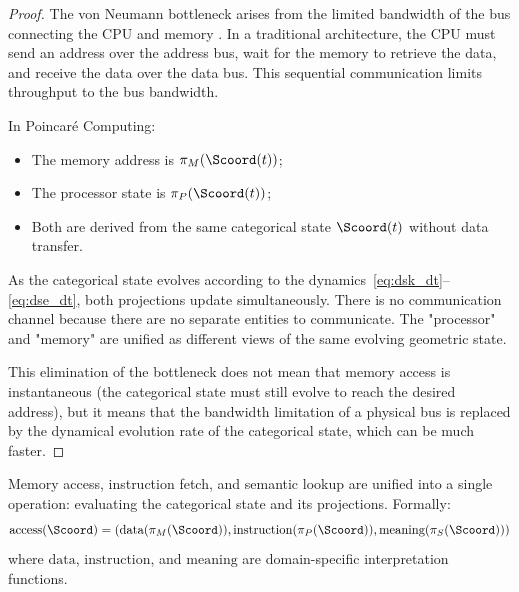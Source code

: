 \begin{proof}
The von Neumann bottleneck arises from the limited bandwidth of the bus connecting the CPU and memory \citep{vonneumann1945first}. In a traditional architecture, the CPU must send an address over the address bus, wait for the memory to retrieve the data, and receive the data over the data bus. This sequential communication limits throughput to the bus bandwidth.

In Poincaré Computing:
\begin{itemize}
    \item The memory address is $\pi_M(\Scoord(t))$;
    \item The processor state is $\pi_P(\Scoord(t))$;
    \item Both are derived from the same categorical state $\Scoord(t)$ without data transfer.
\end{itemize}

As the categorical state evolves according to the dynamics~\eqref{eq:dsk_dt}--\eqref{eq:dse_dt}, both projections update simultaneously. There is no communication channel because there are no separate entities to communicate. The "processor" and "memory" are unified as different views of the same evolving geometric state.

This elimination of the bottleneck does not mean that memory access is instantaneous (the categorical state must still evolve to reach the desired address), but it means that the bandwidth limitation of a physical bus is replaced by the dynamical evolution rate of the categorical state, which can be much faster.
\end{proof}

\begin{proposition}
\label{prop:unified_addressing}
Memory access, instruction fetch, and semantic lookup are unified into a single operation: evaluating the categorical state and its projections. Formally:
\begin{equation}
\text{access}(\Scoord) = \left( \text{data}(\pi_M(\Scoord)), \text{instruction}(\pi_P(\Scoord)), \text{meaning}(\pi_S(\Scoord)) \right)
\label{eq:unified_access}
\end{equation}
where $\text{data}$, $\text{instruction}$, and $\text{meaning}$ are domain-specific interpretation functions.
\end{proposition}

